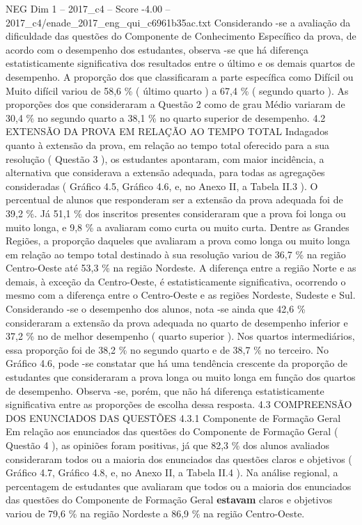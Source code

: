 \begin{textsample}{NEG Dim 1 – 2017\_c4 – Score -4.00 – 2017\_c4/enade\_2017\_eng\_qui\_c6961b35ac.txt}
Considerando -se a avaliação da dificuldade das questões do Componente de Conhecimento Específico da prova, de acordo com o desempenho dos estudantes, observa -se que há diferença estatisticamente significativa dos resultados entre o último e os demais quartos de desempenho.
A proporção dos que classificaram a parte específica como Difícil ou Muito difícil variou de 58,6 \% ( último quarto ) a 67,4 \% ( segundo quarto ).
As proporções dos que consideraram a Questão 2 como de grau Médio variaram de 30,4 \% no segundo quarto a 38,1 \% no quarto superior de desempenho. 4.2 EXTENSÃO DA PROVA EM RELAÇÃO AO TEMPO TOTAL Indagados quanto à extensão da prova, em relação ao tempo total oferecido para a sua resolução ( Questão 3 ), os estudantes apontaram, com maior incidência, a alternativa que considerava a extensão adequada, para todas as agregações consideradas ( Gráfico 4.5, Gráfico 4.6, e, no Anexo II, a Tabela II.3 ).
O percentual de alunos que responderam ser a extensão da prova adequada foi de 39,2 \%.
Já 51,1 \% dos inscritos presentes consideraram que a prova foi longa ou muito longa, e 9,8 \% a avaliaram como curta ou muito curta.
Dentre as Grandes Regiões, a proporção daqueles que avaliaram a prova como longa ou muito longa em relação ao tempo total destinado à sua resolução variou de 36,7 \% na região Centro-Oeste até 53,3 \% na região Nordeste.
A diferença entre a região Norte e as demais, à exceção da Centro-Oeste, é estatisticamente significativa, ocorrendo o mesmo com a diferença entre o Centro-Oeste e as regiões Nordeste, Sudeste e Sul.
Considerando -se o desempenho dos alunos, nota -se ainda que 42,6 \% consideraram a extensão da prova adequada no quarto de desempenho inferior e 37,2 \% no de melhor desempenho ( quarto superior ).
Nos quartos intermediários, essa proporção foi de 38,2 \% no segundo quarto e de 38,7 \% no terceiro.
No Gráfico 4.6, pode -se constatar que há uma tendência crescente da proporção de estudantes que consideraram a prova longa ou muito longa em função dos quartos de desempenho.
Observa -se, porém, que não há diferença estatisticamente significativa entre as proporções de escolha dessa resposta. 4.3 COMPREENSÃO DOS ENUNCIADOS DAS QUESTÕES 4.3.1 Componente de Formação Geral Em relação aos enunciados das questões do Componente de Formação Geral ( Questão 4 ), as opiniões foram positivas, já que 82,3 \% dos alunos avaliados consideraram todos ou a maioria dos enunciados das questões claros e objetivos ( Gráfico 4.7, Gráfico 4.8, e, no Anexo II, a Tabela II.4 ).
Na análise regional, a percentagem de estudantes que avaliaram que todos ou a maioria dos enunciados das questões do Componente de Formação Geral \textbf{estavam} claros e objetivos variou de 79,6 \% na região Nordeste a 86,9 \% na região Centro-Oeste.

\end{textsample}

